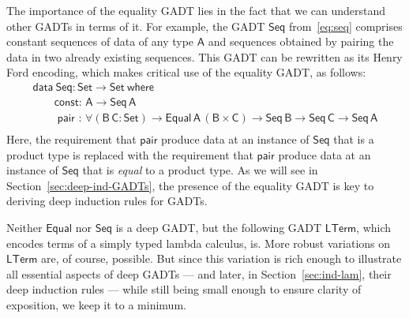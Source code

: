 \documentclass[9pt]{entcs}
\begin{document}
The importance of the equality GADT lies in the fact that we can
understand other GADTs in terms of it. For example, the GADT
$\mathsf{Seq}$ from~\eqref{eq:seq} comprises constant sequences of
data of any type $\mathsf{A}$ and sequences obtained by pairing the
data in two already existing sequences. This GADT can be rewritten as
its Henry Ford encoding, which makes critical use of the equality
GADT, as follows:
\begin{equation}\label{eq:eq_seq}
\begin{array}{l}
\mathsf{data\ Seq : Set \to Set\ where}\\
\mathsf{\;\;\;\;\;\;\;const :\, A \to Seq\,A}\\ 
\mathsf{\;\;\;\;\;\;\;\;pair\,\, :\, \forall (B\,C : Set) \to
  Equal\,A\,(B \times C) \to Seq\,B \to Seq\,C \to Seq\,A}\\ 
\end{array}
\end{equation}
Here, the requirement that $\mathsf{pair}$ produce data at an instance
of $\mathsf{Seq}$ that is a product type is replaced with the
requirement that $\mathsf{pair}$ produce data at an instance of
$\mathsf{Seq}$ that is \emph{equal} to a product type. As we will see
in Section~\ref{sec:deep-ind-GADTs}, the presence of the equality GADT is
key to deriving deep induction rules for GADTs.

Neither $\mathsf{Equal}$ nor $\mathsf{Seq}$ is a deep GADT, but the
following GADT $\mathsf{LTerm}$, which encodes terms of a simply typed
lambda calculus, is. More robust variations on $\mathsf{LTerm}$ are,
of course, possible. But since this variation is rich enough to
illustrate all essential aspects of deep GADTs --- and later, in
Section~\ref{sec:ind-lam}, their deep induction rules --- while still
being small enough to ensure clarity of exposition, we keep it to a
minimum.
\end{document}
